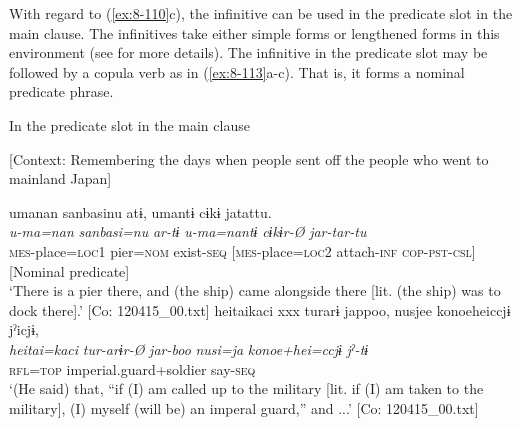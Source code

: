   With regard to (\ref{ex:8-110}c), the infinitive can be used in the predicate slot in the main clause. The infinitives take either simple forms or lengthened forms in this environment (see  for more details). The infinitive in the predicate slot may be followed by a copula verb as in (\ref{ex:8-113}a-c). That is, it forms a nominal predicate phrase.

\ea\label{ex:8-113}
  In the predicate slot in the main clause

\ea {}[Context: Remembering the days when people sent off the people who went to mainland Japan]

{\TM}
\glll  umanan  sanbasinu  atɨ,      umantɨ  cɨkɨ  jatattu.\\
\textit{u-ma=nan}  \textit{sanbasi=nu}  \textit{ar-tɨ}      \textit{u-ma=nantɨ}  \textit{cɨkɨr-Ø}  \textit{jar-tar-tu}\\
\textsc{mes}-place=\textsc{loc1}  pier=\textsc{nom}  exist-\textsc{seq}  [\textsc{mes}-place=\textsc{loc}2  attach-\textsc{inf}  \textsc{cop}-\textsc{pst}-\textsc{csl}]\\
      {}[Nominal predicate]\\
\glt ‘There is a pier there, and (the ship) came alongside there [lit. (the ship) was to dock there].’ [Co: 120415\_00.txt]
\ex
{\TM}
\glll  {\textbar}heitai{\textbar}kaci  xxx  turarɨ  jappoo,  nusjee    {\textbar}konoehei{\textbar}ccjɨ  jˀicjɨ,  \\
\textit{heitai=kaci}    \textit{tur-arɨr-Ø}  \textit{jar-boo}  \textit{nusi=ja}    \textit{konoe+hei=ccjɨ}  \textit{jˀ-tɨ}  \\
[soldier=\textsc{all}    take-\textsc{pass}-\textsc{inf}  \textsc{cop}-\textsc{cnd}]  \textsc{rfl}=\textsc{top}   imperial.guard+soldier  say-\textsc{seq}\\
\glt ‘(He said) that, “if (I) am called up to the military [lit. if (I) am taken to the military], (I) myself (will be) an imperal guard,” and ...’ [Co: 120415\_00.txt]

